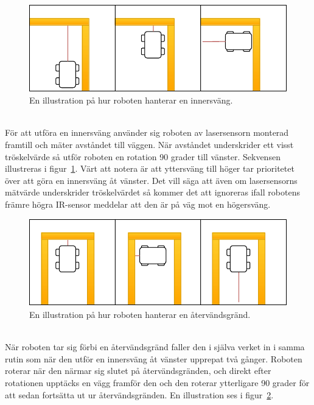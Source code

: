 \documentclass{article}
\begin{document}
\begin{figure}[H]
\centering
\includegraphics[scale=0.6]{navigation_inner_turn}
\caption{En illustration på hur roboten hanterar en innersväng.}
\label{fig:navigation_inner_turn}
\end{figure}
\ \\
\newline
För att utföra en innersväng använder sig roboten av lasersensorn monterad framtill och mäter avståndet till väggen. När avståndet underskrider ett visst tröskelvärde så utför roboten en rotation 90 grader till vänster. Sekvensen illustreras i figur~\ref{fig:navigation_inner_turn}. Värt att notera är att yttersväng till höger tar prioritetet över att göra en innersväng åt vänster. Det vill säga att även om lasersensorns mätvärde underskrider tröskelvärdet så kommer det att ignoreras ifall robotens främre högra IR-sensor meddelar att den är på väg mot en högersväng.
\newpage
\begin{figure}[H]
\centering
\includegraphics[scale=0.6]{navigation_dead_end}
\caption{En illustration på hur roboten hanterar en återvändsgränd.}
\label{fig:navigation_dead_end}
\end{figure}
\ \\
\newline
När roboten tar sig förbi en återvändsgränd faller den i själva verket in i samma rutin som när den utför en innersväng åt vänster upprepat två gånger. Roboten roterar när den närmar sig slutet på återvändsgränden, och direkt efter rotationen upptäcks en vägg framför den och den roterar ytterligare 90 grader för att sedan fortsätta ut ur återvändsgränden. En illustration ses i figur~\ref{fig:navigation_dead_end}.
\end{document}
